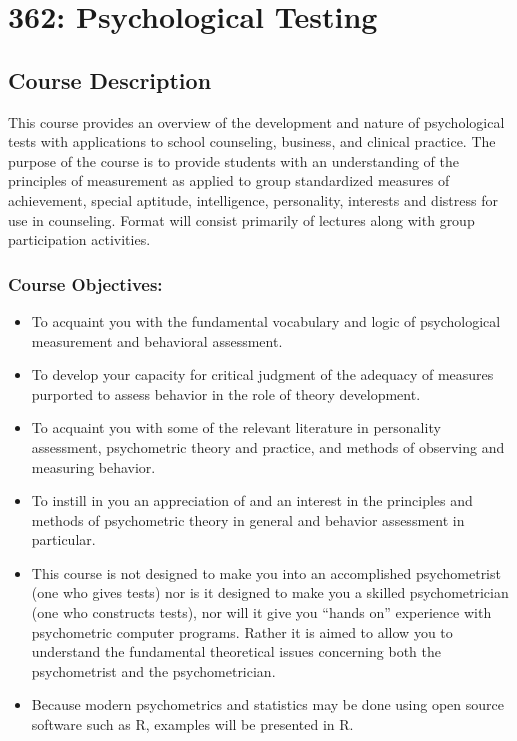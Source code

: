 \hypertarget{testing}{%
\chapter*{362: Psychological Testing}\label{testing}}


\hypertarget{course-description-2}{%
\section*{Course Description}\label{course-description-2}}


This course provides an overview of the development and nature of psychological tests with applications to school counseling, business, and clinical practice. The purpose of the course is to provide students with an understanding of the principles of measurement as applied to group standardized measures of achievement, special aptitude, intelligence, personality, interests and distress for use in counseling. Format will consist primarily of lectures along with group participation activities.

\hypertarget{course-objectives}{%
\subsection*{Course Objectives:}\label{course-objectives}}


\begin{itemize}
\tightlist
\item
  To acquaint you with the fundamental vocabulary and logic of psychological measurement and behavioral assessment.
\item
  To develop your capacity for critical judgment of the adequacy of measures purported to assess behavior in the role of theory development.
\item
  To acquaint you with some of the relevant literature in personality assessment, psychometric theory and practice, and methods of observing and measuring behavior.
\item
  To instill in you an appreciation of and an interest in the principles and methods of psychometric theory in general and behavior assessment in particular.
\item
  This course is not designed to make you into an accomplished psychometrist (one who gives tests) nor is it designed to make you a skilled psychometrician (one who constructs tests), nor will it give you ``hands on'' experience with psychometric computer programs. Rather it is aimed to allow you to understand the fundamental theoretical issues concerning both the psychometrist and the psychometrician.
\item
  Because modern psychometrics and statistics may be done using open source software such as R, examples will be presented in R.
\end{itemize}

